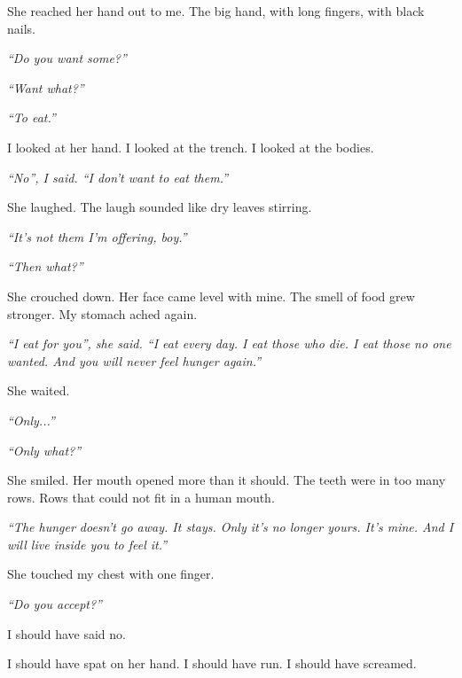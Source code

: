 \noindent She reached her hand out to me. The big hand, with long fingers, with black nails.

\noindent \textit{\textquotedblleft{}Do you want some?\textquotedblright{}}

\noindent \textit{\textquotedblleft{}Want what?\textquotedblright{}}

\noindent \textit{\textquotedblleft{}To eat.\textquotedblright{}}

\noindent I looked at her hand. I looked at the trench. I looked at the bodies.

\noindent \textit{\textquotedblleft{}No\textquotedblright{}\textit{, I said. }\textquotedblleft{}I don't want to eat them.\textquotedblright{}}

\noindent She laughed. The laugh sounded like dry leaves stirring.

\noindent \textit{\textquotedblleft{}It's not them I'm offering, boy.\textquotedblright{}}

\noindent \textit{\textquotedblleft{}Then what?\textquotedblright{}}

\noindent She crouched down. Her face came level with mine. The smell of food grew stronger. My stomach ached again.

\noindent \textit{\textquotedblleft{}I eat for you\textquotedblright{}\textit{, she said. }\textquotedblleft{}I eat every day. I eat those who die. I eat those no one wanted. And you will never feel hunger again.\textquotedblright{}}

\noindent She waited.

\noindent \textit{\textquotedblleft{}Only...\textquotedblright{}}

\noindent \textit{\textquotedblleft{}Only what?\textquotedblright{}}

\noindent She smiled. Her mouth opened more than it should. The teeth were in too many rows. Rows that could not fit in a human mouth.

\noindent \textit{\textquotedblleft{}The hunger doesn't go away. It stays. Only it's no longer yours. It's mine. And I will live inside you to feel it.\textquotedblright{}}

\noindent She touched my chest with one finger.

\noindent \textit{\textquotedblleft{}Do you accept?\textquotedblright{}}

\noindent I should have said no.

\noindent I should have spat on her hand. I should have run. I should have screamed.


